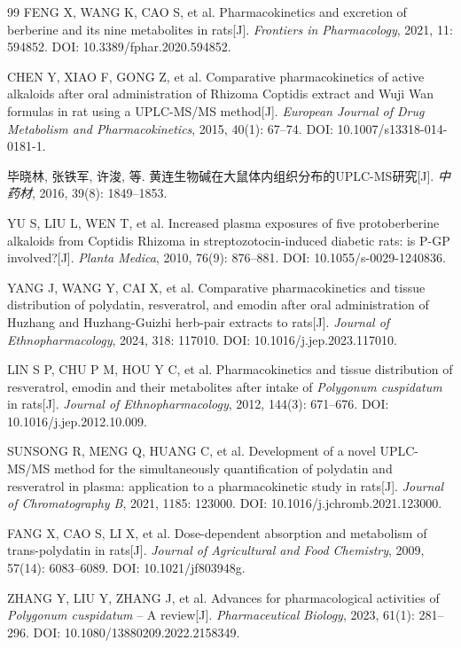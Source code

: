 \documentclass[12pt,a4paper,UTF8,scheme=chinese]{ctexart}
\begin{document}
\begin{thebibliography}{99}
FENG X, WANG K, CAO S, et al. Pharmacokinetics and excretion of berberine and its nine metabolites in rats[J]. \textit{Frontiers in Pharmacology}, 2021, 11: 594852. DOI: 10.3389/fphar.2020.594852.

CHEN Y, XIAO F, GONG Z, et al. Comparative pharmacokinetics of active alkaloids after oral administration of Rhizoma Coptidis extract and Wuji Wan formulas in rat using a UPLC-MS/MS method[J]. \textit{European Journal of Drug Metabolism and Pharmacokinetics}, 2015, 40(1): 67--74. DOI: 10.1007/s13318-014-0181-1.

毕晓林, 张铁军, 许浚, 等. 黄连生物碱在大鼠体内组织分布的UPLC-MS研究[J]. \textit{中药材}, 2016, 39(8): 1849--1853.

YU S, LIU L, WEN T, et al. Increased plasma exposures of five protoberberine alkaloids from Coptidis Rhizoma in streptozotocin-induced diabetic rats: is P-GP involved?[J]. \textit{Planta Medica}, 2010, 76(9): 876--881. DOI: 10.1055/s-0029-1240836.

YANG J, WANG Y, CAI X, et al. Comparative pharmacokinetics and tissue distribution of polydatin, resveratrol, and emodin after oral administration of Huzhang and Huzhang-Guizhi herb-pair extracts to rats[J]. \textit{Journal of Ethnopharmacology}, 2024, 318: 117010. DOI: 10.1016/j.jep.2023.117010.

LIN S P, CHU P M, HOU Y C, et al. Pharmacokinetics and tissue distribution of resveratrol, emodin and their metabolites after intake of \textit{Polygonum cuspidatum} in rats[J]. \textit{Journal of Ethnopharmacology}, 2012, 144(3): 671--676. DOI: 10.1016/j.jep.2012.10.009.

SUNSONG R, MENG Q, HUANG C, et al. Development of a novel UPLC-MS/MS method for the simultaneously quantification of polydatin and resveratrol in plasma: application to a pharmacokinetic study in rats[J]. \textit{Journal of Chromatography B}, 2021, 1185: 123000. DOI: 10.1016/j.jchromb.2021.123000.

FANG X, CAO S, LI X, et al. Dose-dependent absorption and metabolism of trans-polydatin in rats[J]. \textit{Journal of Agricultural and Food Chemistry}, 2009, 57(14): 6083--6089. DOI: 10.1021/jf803948g.

ZHANG Y, LIU Y, ZHANG J, et al. Advances for pharmacological activities of \textit{Polygonum cuspidatum} -- A review[J]. \textit{Pharmaceutical Biology}, 2023, 61(1): 281--296. DOI: 10.1080/13880209.2022.2158349.


\end{thebibliography}
\end{document}
